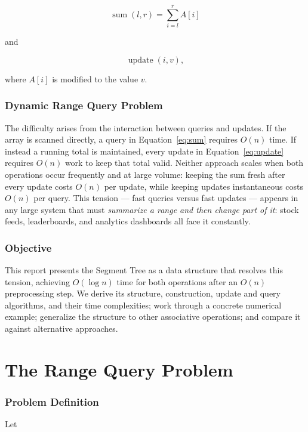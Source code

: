 \documentclass[11pt,open=any]{scrreprt}
\begin{document}
\begin{equation}
\operatorname{sum}(l,r) = \sum_{i=l}^{r} A[i]
\label{eq:sum}
\end{equation}

and

\begin{equation}
\operatorname{update}(i,v),
\label{eq:update}
\end{equation}

where $A[i]$ is modified to the value $v$.

\subsection{Dynamic Range Query Problem}
The difficulty arises from the interaction between queries and updates. If the array is scanned directly, a query in Equation~\eqref{eq:sum} requires $O(n)$ time. If instead a running total is maintained, every update in Equation~\eqref{eq:update} requires $O(n)$ work to keep that total valid. Neither approach scales when both operations occur frequently and at large volume: keeping the sum fresh after every update costs $O(n)$ per update, while keeping updates instantaneous costs $O(n)$ per query. This tension --- fast queries versus fast updates --- appears in any large system that must \emph{summarize a range and then change part of it}: stock feeds, leaderboards, and analytics dashboards all face it constantly.

\subsection{Objective}
This report presents the Segment Tree as a data structure that resolves this tension, achieving $O(\log n)$ time for both operations after an $O(n)$ preprocessing step. We derive its structure, construction, update and query algorithms, and their time complexities; work through a concrete numerical example; generalize the structure to other associative operations; and compare it against alternative approaches.

\chapter{The Range Query Problem}

\subsection{Problem Definition}
Let
\end{document}
